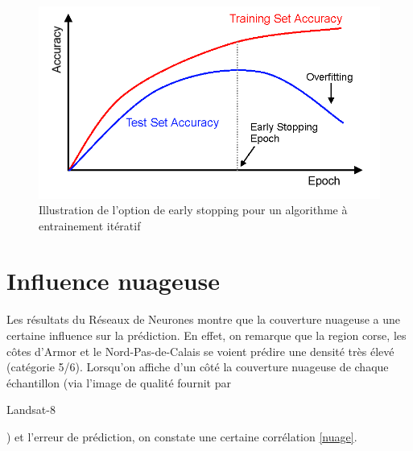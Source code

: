 \documentclass{book}
\begin{document}
\begin{figure}[H]
\centerline{
\includegraphics[scale=0.5]{images/earlystopping.png}
}
\caption{Illustration de l'option de \og early stopping \fg{} pour un algorithme à entrainement itératif}
\label{early}
\end{figure}


\section{Influence nuageuse}

Les résultats du Réseaux de Neurones montre que la couverture nuageuse a une certaine influence sur la prédiction.
En effet, on remarque que la region corse, les côtes d'Armor et le Nord-Pas-de-Calais se voient prédire une densité très élevé (catégorie 5/6). Lorsqu'on 
affiche d'un côté la couverture nuageuse de chaque échantillon (via l'image de qualité fournit par \begin{itshape}Landsat-8\end{itshape}) et 
l'erreur de prédiction, on constate une certaine corrélation \ref{nuage}.
\end{document}
